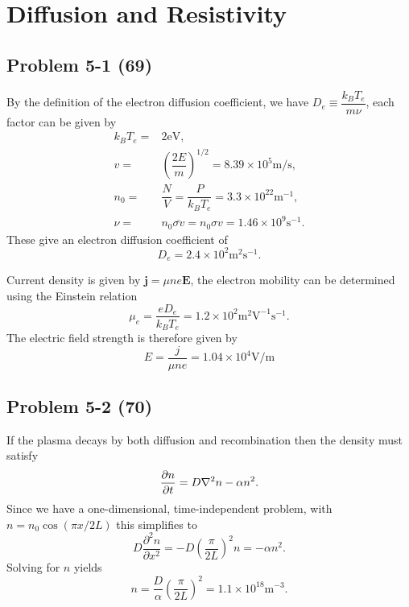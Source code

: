 \chapter{Diffusion and Resistivity}
\label{ch:Five}

\section*{Problem 5-1 (69)}
\label{sec:5-1}
By the definition of the electron diffusion coefficient, we have \(D_e \equiv \dfrac{k_BT_e}{m\nu} \), each factor can be given by
\begin{align*}
	k_BT_e =& 2\text{eV},\\
	v =& \left(\dfrac{2E}{m}\right)^{1/2} = 8.39 \times 10^5 \text{m/s},\\
	n_0 =& \dfrac{N}{V} = \dfrac{P}{k_BT_e} = 3.3\times 10^{22} \text{m}^{-1}, \\
	\nu =& n_0\overline{\sigma v} = n_0\sigma v = 1.46 \times 10^9\text{s}^{-1}.
\end{align*}
These give an electron diffusion coefficient of
\begin{equation*}
	D_e = 2.4\times10^2\text{m}^2\text{s}^{-1}.
\end{equation*}

Current density is given by \(\bm{j} = \mu n e \bm{E} \), the electron mobility can be determined using the Einstein relation
\begin{equation*}
	\mu_e = \dfrac{eD_e}{k_BT_e} = 1.2\times 10^2 \text{m}^2\text{V}^{-1}\text{s}^{-1}.
\end{equation*}
The electric field strength is therefore given by
\begin{equation*}
	E = \dfrac{j}{\mu ne} = 1.04 \times 10^4 \text{V}/\text{m}
\end{equation*}


\section*{Problem 5-2 (70)}
\label{sec:5-2}
If the plasma decays by both diffusion and recombination then the density must satisfy
\begin{equation*}
	\frac{\partial n}{\partial t} = D\nabla^2n - \alpha n^2.
\end{equation*}
Since we have a one-dimensional, time-independent problem, with \(n = n_0\cos(\pi x/2L)\) this simplifies to
\begin{equation*}
	D\dfrac{\partial^2n}{\partial x^2} = -D\left(\dfrac{\pi}{2L}\right)^2n = -\alpha n^2.
\end{equation*}
Solving for \(n\) yields
\begin{equation*}
	n = \dfrac{D}{\alpha} \left(\dfrac{\pi}{2L}\right)^2 = 1.1\times 10^{18}\text{m}^{-3}.
\end{equation*}

